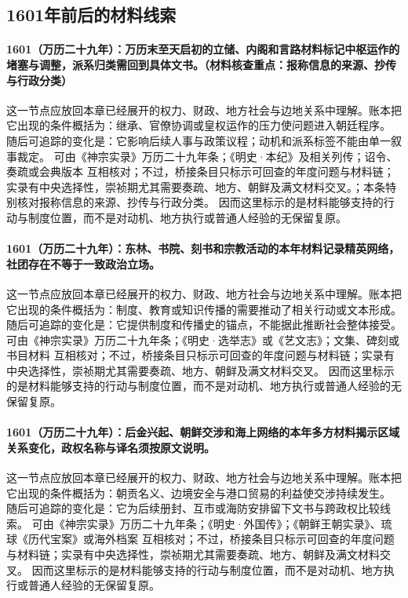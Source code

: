 \subsection{1601年前后的材料线索}

\paragraph{1601（万历二十九年）：万历末至天启初的立储、内阁和言路材料标记中枢运作的堵塞与调整，派系归类需回到具体文书。（材料核查重点：报称信息的来源、抄传与行政分类）} 这一节点应放回本章已经展开的权力、财政、地方社会与边地关系中理解。账本把它出现的条件概括为：继承、官僚协调或皇权运作的压力使问题进入朝廷程序。 随后可追踪的变化是：它影响后续人事与政策议程；动机和派系标签不能由单一叙事裁定。 可由《神宗实录》万历二十九年条；《明史·本纪》及相关列传；诏令、奏疏或会典版本 互相核对；不过，桥接条目只标示可回查的年度问题与材料链；实录有中央选择性，崇祯期尤其需要奏疏、地方、朝鲜及满文材料交叉。；本条特别核对报称信息的来源、抄传与行政分类。 因而这里标示的是材料能够支持的行动与制度位置，而不是对动机、地方执行或普通人经验的无保留复原。

\paragraph{1601（万历二十九年）：东林、书院、刻书和宗教活动的本年材料记录精英网络，社团存在不等于一致政治立场。} 这一节点应放回本章已经展开的权力、财政、地方社会与边地关系中理解。账本把它出现的条件概括为：制度、教育或知识传播的需要推动了相关行动或文本形成。 随后可追踪的变化是：它提供制度和传播史的锚点，不能据此推断社会整体接受。 可由《神宗实录》万历二十九年条；《明史·选举志》或《艺文志》；文集、碑刻或书目材料 互相核对；不过，桥接条目只标示可回查的年度问题与材料链；实录有中央选择性，崇祯期尤其需要奏疏、地方、朝鲜及满文材料交叉。 因而这里标示的是材料能够支持的行动与制度位置，而不是对动机、地方执行或普通人经验的无保留复原。

\paragraph{1601（万历二十九年）：后金兴起、朝鲜交涉和海上网络的本年多方材料揭示区域关系变化，政权名称与译名须按原文说明。} 这一节点应放回本章已经展开的权力、财政、地方社会与边地关系中理解。账本把它出现的条件概括为：朝贡名义、边境安全与港口贸易的利益使交涉持续发生。 随后可追踪的变化是：它为后续册封、互市或海防安排留下文书与跨政权比较线索。 可由《神宗实录》万历二十九年条；《明史·外国传》；《朝鲜王朝实录》、琉球《历代宝案》或海外档案 互相核对；不过，桥接条目只标示可回查的年度问题与材料链；实录有中央选择性，崇祯期尤其需要奏疏、地方、朝鲜及满文材料交叉。 因而这里标示的是材料能够支持的行动与制度位置，而不是对动机、地方执行或普通人经验的无保留复原。

